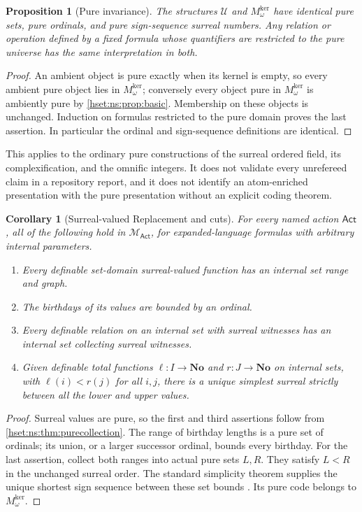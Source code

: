 \documentclass[11pt,letterpaper]{article}
\newtheorem{proposition}[proposition]{Proposition}\aliascntresetthe{proposition}
\newtheorem{corollary}[corollary]{Corollary}\aliascntresetthe{corollary}
\theoremstyle{definition}
\theoremstyle{remark}
\newcommand{\No}{\mathbf{No}}
\newcommand{\Mker}{M^{\mathrm{ker}}}
\newcommand{\Uk}{\mathcal U}
\newcommand{\Act}{\mathsf{Act}}
\newcommand{\MAct}{\mathcal M_{\Act}}
\begin{document}
\begin{proposition}[Pure invariance]\label{hset:ns:prop:surrealinvariance}
The structures $\Uk$ and $\Mker_\omega$ have identical pure sets, pure ordinals, and pure sign-sequence surreal numbers. Any relation or operation defined by a fixed formula whose quantifiers are restricted to the pure universe has the same interpretation in both.
\end{proposition}
\begin{proof}
An ambient object is pure exactly when its kernel is empty, so every ambient pure object lies in $\Mker_\omega$; conversely every object pure in $\Mker_\omega$ is ambiently pure by \cref{hset:ns:prop:basic}. Membership on these objects is unchanged. Induction on formulas restricted to the pure domain proves the last assertion. In particular the ordinal and sign-sequence definitions are identical.
\end{proof}

This applies to the ordinary pure constructions of the surreal ordered field, its complexification, and the omnific integers. It does not validate every unrefereed claim in a repository report, and it does not identify an atom-enriched presentation with the pure presentation without an explicit coding theorem.

\begin{corollary}[Surreal-valued Replacement and cuts]\label{hset:ns:cor:surreal}
For every named action $\Act$, all of the following hold in $\MAct$, for expanded-language formulas with arbitrary internal parameters.
\begin{enumerate}
\item Every definable set-domain surreal-valued function has an internal set range and graph.
\item The birthdays of its values are bounded by an ordinal.
\item Every definable relation on an internal set with surreal witnesses has an internal set collecting surreal witnesses.
\item Given definable total functions $\ell:I\to\No$ and $r:J\to\No$ on internal sets, with $\ell(i)<r(j)$ for all $i,j$, there is a unique simplest surreal strictly between all the lower and upper values.
\end{enumerate}
\end{corollary}
\begin{proof}
Surreal values are pure, so the first and third assertions follow from \cref{hset:ns:thm:purecollection}. The range of birthday lengths is a pure set of ordinals; its union, or a larger successor ordinal, bounds every birthday. For the last assertion, collect both ranges into actual pure sets $L,R$. They satisfy $L<R$ in the unchanged surreal order. The standard simplicity theorem supplies the unique shortest sign sequence between these set bounds \cite{Gonshor}. Its pure code belongs to $\Mker_\omega$.
\end{proof}
\end{document}
